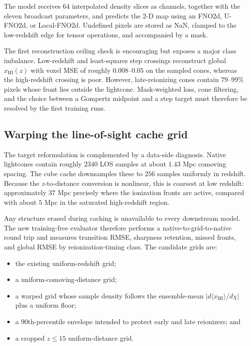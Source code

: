 \documentclass[11pt,a4paper]{article}
\newcommand{\xhi}{x_{\mathrm{HI}}}
\begin{document}
The model receives \(64\) interpolated density slices as channels, together
with the eleven broadcast parameters, and predicts the 2-D map using an
FNO2d, U-FNO2d, or Local-FNO2d. Undefined pixels are stored as NaN, clamped to
the low-redshift edge for tensor operations, and accompanied by a mask.

The first reconstruction ceiling check is encouraging but exposes a major
class imbalance. Low-redshift and least-squares step crossings reconstruct
global \(\xhi(z)\) with voxel MSE of roughly \(0.008\)--\(0.05\) on the sampled
cones, whereas the high-redshift crossing is poor. However, late-reionizing
cones contain \(79\)--\(99\%\) pixels whose front lies outside the lightcone.
Mask-weighted loss, cone filtering, and the choice between a Gompertz midpoint
and a step target must therefore be resolved by the first training runs.

\subsection{Warping the line-of-sight cache grid}

The target reformulation is complemented by a data-side diagnosis. Native
lightcones contain roughly \(2340\) LOS samples at about \(1.43\) Mpc comoving
spacing. The cube cache downsamples these to \(256\) samples uniformly in
redshift. Because the \(z\)-to-distance conversion is nonlinear, this is
coarsest at low redshift: approximately \(37\) Mpc precisely where the
ionization fronts are active, compared with about \(5\) Mpc in the saturated
high-redshift region.

Any structure erased during caching is unavailable to every downstream model.
The new training-free evaluator therefore performs a native-to-grid-to-native
round trip and measures transition RMSE, sharpness retention, missed fronts,
and global RMSE by reionization-timing class. The candidate grids are:
\begin{itemize}
  \item the existing uniform-redshift grid;
  \item a uniform-comoving-distance grid;
  \item a warped grid whose sample density follows the ensemble-mean
  \(\left|d\langle\xhi\rangle/d\chi\right|\) plus a uniform floor;
  \item a 90th-percentile envelope intended to protect early and late
  reionizers; and
  \item a cropped \(z\leq15\) uniform-distance grid.
\end{itemize}
\end{document}

